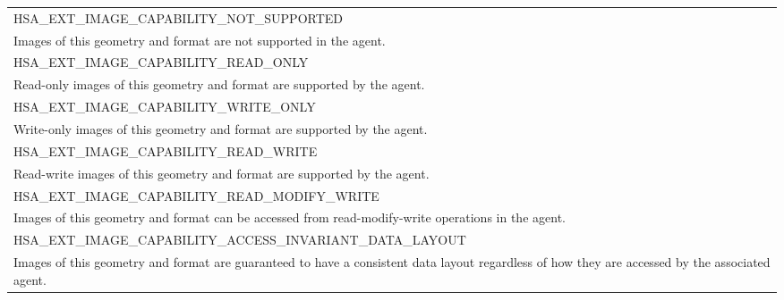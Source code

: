 \documentclass[final,oneside]{book}
\newcommand{\reftyp}[1]{#1}
\newcommand{\refenu}[1]{\reftyp{#1}}
\begin{document}
\begin{longtable}{@{\hspace{2em}}p{\linewidth-2em}}
\hspace{-2em}\refenu{HSA_\-EXT_\-IMAGE_\-CAPABILITY_\-NOT_\-SUPPORTED}\\Images of this geometry and format are not supported in the agent.\\[2mm]
\hspace{-2em}\refenu{HSA_\-EXT_\-IMAGE_\-CAPABILITY_\-READ_\-ONLY}\\Read-only images of this geometry and format are supported by the agent.\\[2mm]
\hspace{-2em}\refenu{HSA_\-EXT_\-IMAGE_\-CAPABILITY_\-WRITE_\-ONLY}\\Write-only images of this geometry and format are supported by the agent.\\[2mm]
\hspace{-2em}\refenu{HSA_\-EXT_\-IMAGE_\-CAPABILITY_\-READ_\-WRITE}\\Read-write images of this geometry and format are supported by the agent.\\[2mm]
\hspace{-2em}\refenu{HSA_\-EXT_\-IMAGE_\-CAPABILITY_\-READ_\-MODIFY_\-WRITE}\\Images of this geometry and format can be accessed from read-modify-write operations in the agent.\\[2mm]
\hspace{-2em}\refenu{HSA_\-EXT_\-IMAGE_\-CAPABILITY_\-ACCESS_\-INVARIANT_\-DATA_\-LAYOUT}\\Images of this geometry and format are guaranteed to have a consistent data layout regardless of how they are accessed by the associated agent.
\end{longtable}
\end{document}
